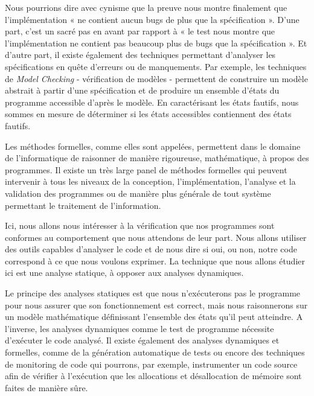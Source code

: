\documentclass[middle]{zmdocument}
\begin{document}
Nous pourrions dire avec cynisme que la preuve nous montre finalement que 
l'implémentation « ne contient aucun bugs de plus que la spécification ». D'une 
part, c'est un sacré pas en avant par rapport à « le test nous montre que 
l'implémentation ne contient pas beaucoup plus de bugs que la spécification ». 
Et d'autre part, il existe également des techniques permettant d'analyser les 
spécifications en quête d'erreurs ou de manquements. Par exemple, les techniques
de \textit{Model Checking} - vérification de modèles - permettent de construire un modèle
abstrait à partir d'une spécification et de produire un ensemble d'états du 
programme accessible d'après le modèle. En caractérisant les états fautifs, nous
sommes en mesure de déterminer si les états accessibles contiennent des états
fautifs.





Les méthodes formelles, comme elles sont appelées, permettent dans le domaine de 
l'informatique de raisonner de manière rigoureuse, mathématique, à propos des 
programmes. Il existe un très large panel de méthodes formelles qui peuvent 
intervenir à tous les niveaux de la conception, l'implémentation, l'analyse et
la validation des programmes ou de manière plus générale de tout système
permettant le traitement de l'information.



Ici, nous allons nous intéresser à la vérification que nos programmes sont 
conformes au comportement que nous attendons de leur part. Nous allons utiliser 
des outils capables d'analyser le code et de nous dire si oui, ou non, notre 
code correspond à ce que nous voulons exprimer. La technique que nous allons 
étudier ici est une analyse statique, à opposer aux analyses dynamiques.



Le principe des analyses statiques est que nous n'exécuterons pas le programme 
pour nous assurer que son fonctionnement est correct, mais nous raisonnerons sur 
un modèle mathématique définissant l'ensemble des états qu'il peut atteindre.
A l'inverse, les analyses dynamiques comme le test de programme nécessite 
d'exécuter le code analysé. Il existe également des analyses dynamiques et 
formelles, comme de la génération automatique de tests ou encore des techniques de
monitoring de code qui pourrons, par exemple, instrumenter un code source afin de
vérifier à l'exécution que les allocations et désallocation de mémoire sont faites
de manière sûre.
\end{document}
